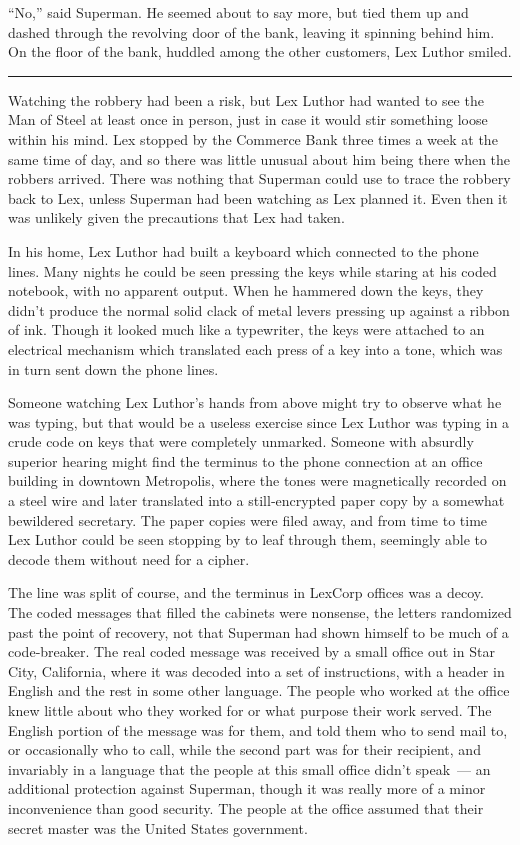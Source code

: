 ``No,'' said Superman. He seemed about to say more, but tied them up and
dashed through the revolving door of the bank, leaving it spinning
behind him. On the floor of the bank, huddled among the other customers,
Lex Luthor smiled.

\begin{center}\rule{0.5\linewidth}{0.5pt}\end{center}

Watching the robbery had been a risk, but Lex Luthor had wanted to see
the Man of Steel at least once in person, just in case it would stir
something loose within his mind. Lex stopped by the Commerce Bank three
times a week at the same time of day, and so there was little unusual
about him being there when the robbers arrived. There was nothing that
Superman could use to trace the robbery back to Lex, unless Superman had
been watching as Lex planned it. Even then it was unlikely given the
precautions that Lex had taken.

In his home, Lex Luthor had built a keyboard which connected to the
phone lines. Many nights he could be seen pressing the keys while
staring at his coded notebook, with no apparent output. When he hammered
down the keys, they didn't produce the normal solid clack of metal
levers pressing up against a ribbon of ink. Though it looked much like a
typewriter, the keys were attached to an electrical mechanism which
translated each press of a key into a tone, which was in turn sent down
the phone lines.

Someone watching Lex Luthor's hands from above might try to observe what
he was typing, but that would be a useless exercise since Lex Luthor was
typing in a crude code on keys that were completely unmarked. Someone
with absurdly superior hearing might find the terminus to the phone
connection at an office building in downtown Metropolis, where the tones
were magnetically recorded on a steel wire and later translated into a
still‐encrypted paper copy by a somewhat bewildered secretary. The paper
copies were filed away, and from time to time Lex Luthor could be seen
stopping by to leaf through them, seemingly able to decode them without
need for a cipher.

The line was split of course, and the terminus in LexCorp offices was a
decoy. The coded messages that filled the cabinets were nonsense, the
letters randomized past the point of recovery, not that Superman had
shown himself to be much of a code‐breaker. The real coded message was
received by a small office out in Star City, California, where it was
decoded into a set of instructions, with a header in English and the
rest in some other language. The people who worked at the office knew
little about who they worked for or what purpose their work served. The
English portion of the message was for them, and told them who to send
mail to, or occasionally who to call, while the second part was for
their recipient, and invariably in a language that the people at this
small office didn't speak~--- an additional protection against Superman,
though it was really more of a minor inconvenience than good security.
The people at the office assumed that their secret master was the United
States government.

